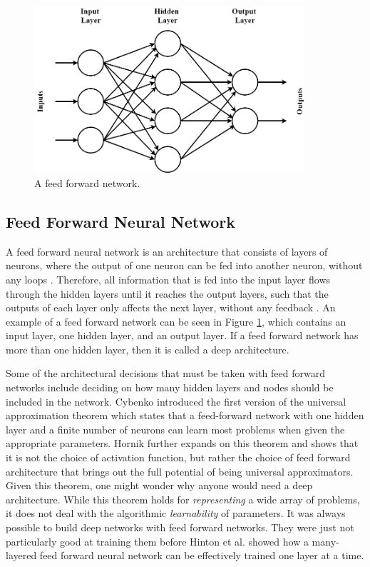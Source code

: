 \documentclass{UoYCSproject}
\begin{document}
\begin{figure}[h]
\includegraphics[width=10cm]{feedforward.png}
\centering
\caption{A feed forward network.} 
\label{fig:feedforward}
\end{figure}

\subsection{Feed Forward Neural Network}
A feed forward neural network is an architecture that consists of layers of neurons, where the output of one neuron can be fed into another neuron, without any loops \cite{jain1996artificial}. Therefore, all information that is fed into the input layer flows through the hidden layers until it reaches the output layers, such that the outputs of each layer only affects the next layer, without any feedback \cite{jhaartificial}. An example of a feed forward network can be seen in Figure \ref{fig:feedforward}, which contains an input layer, one hidden layer, and an output layer. If a feed forward network has more than one hidden layer, then it is called a deep architecture. 

Some of the architectural decisions that must be taken with feed forward networks include deciding on how many hidden layers and nodes should be included in the network. Cybenko \cite{cybenko1989approximation} introduced the first version of the universal approximation theorem which states that a feed-forward network with one hidden layer and a finite number of neurons can learn most problems when given the appropriate parameters. Hornik \cite{hornik1991approximation} further expands on this theorem and shows that it is not the choice of activation function, but rather the choice of feed forward architecture that brings out the full potential of being universal approximators. Given this theorem, one might wonder why anyone would need a deep architecture. While this theorem holds for \textit{representing} a wide array of problems, it does not deal with the algorithmic \textit{learnability} of parameters. It was always possible to build deep networks with feed forward networks. They were just not particularly good at training them before Hinton et al. \cite{hinton2006fast} showed how a many-layered feed forward neural network can be effectively trained one layer at a time. 
\end{document}
